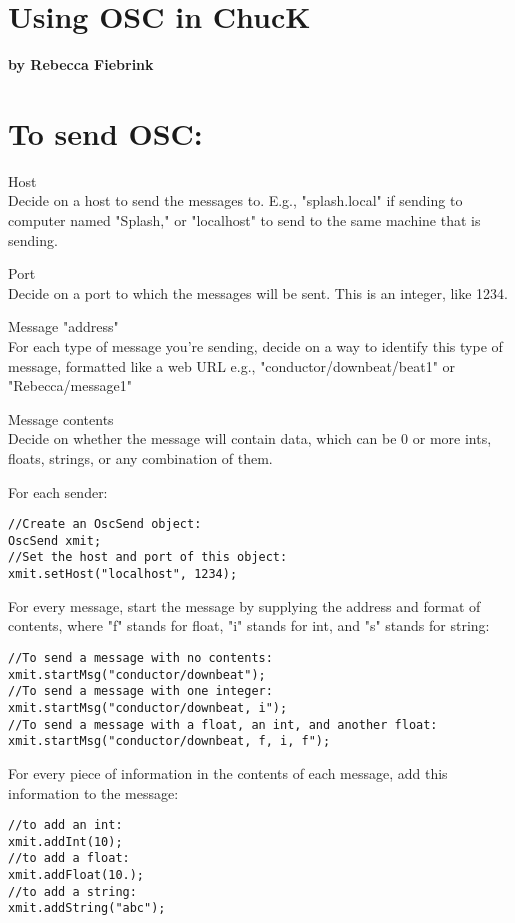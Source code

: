 \section{Using OSC in ChucK} 
\textbf{by Rebecca Fiebrink}\\

\section*{To send OSC:}
Host\\ 
Decide on a host to send the messages to. E.g., "splash.local" if sending to computer named "Splash," or "localhost" to send to the same machine that is sending. 

Port\\ 
Decide on a port to which the messages will be sent. This is an integer, like 1234. 

Message "address" \\ 
For each type of message you're sending, decide on a way to identify this type of message, formatted like a web URL e.g., "conductor/downbeat/beat1" or "Rebecca/message1" 

Message contents \\
Decide on whether the message will contain data, which can be 0 or more ints, floats, strings, or any combination of them. 

For each sender: 
\begin{verbatim}
//Create an OscSend object: 
OscSend xmit; 
//Set the host and port of this object: 
xmit.setHost("localhost", 1234); 
\end{verbatim}

For every message, start the message by supplying the address and format of contents, where "f" stands for float, "i" stands for int, and "s" stands for string: 
\begin{verbatim}
//To send a message with no contents: 
xmit.startMsg("conductor/downbeat"); 
//To send a message with one integer: 
xmit.startMsg("conductor/downbeat, i"); 
//To send a message with a float, an int, and another float: 
xmit.startMsg("conductor/downbeat, f, i, f"); 
\end{verbatim}

For every piece of information in the contents of each message, add this information to the message: 
\begin{verbatim}
//to add an int: 
xmit.addInt(10); 
//to add a float: 
xmit.addFloat(10.); 
//to add a string: 
xmit.addString("abc"); 
\end{verbatim}

